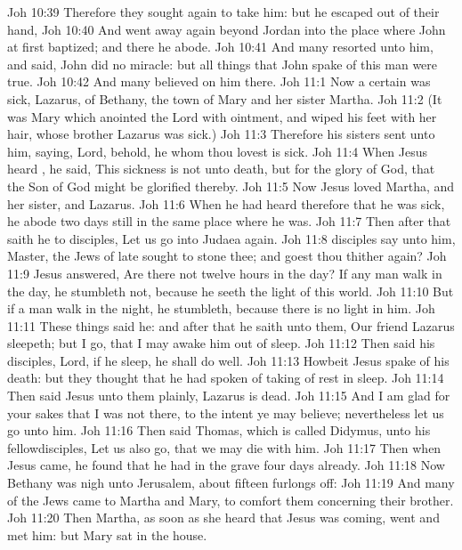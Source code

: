 \vs Joh 10:39 Therefore they sought again to take him: but he escaped out of their hand,
\vs Joh 10:40 And went away again beyond Jordan into the place where John at first baptized; and there he abode.
\vs Joh 10:41 And many resorted unto him, and said, John did no miracle: but all things that John spake of this man were true.
\vs Joh 10:42 And many believed on him there.
\vs Joh 11:1 Now a certain  was sick,  Lazarus, of Bethany, the town of Mary and her sister Martha.
\vs Joh 11:2 (It was  Mary which anointed the Lord with ointment, and wiped his feet with her hair, whose brother Lazarus was sick.)
\vs Joh 11:3 Therefore his sisters sent unto him, saying, Lord, behold, he whom thou lovest is sick.
\vs Joh 11:4 When Jesus heard , he said, This sickness is not unto death, but for the glory of God, that the Son of God might be glorified thereby.
\vs Joh 11:5 Now Jesus loved Martha, and her sister, and Lazarus.
\vs Joh 11:6 When he had heard therefore that he was sick, he abode two days still in the same place where he was.
\vs Joh 11:7 Then after that saith he to  disciples, Let us go into Judaea again.
\vs Joh 11:8  disciples say unto him, Master, the Jews of late sought to stone thee; and goest thou thither again?
\vs Joh 11:9 Jesus answered, Are there not twelve hours in the day? If any man walk in the day, he stumbleth not, because he seeth the light of this world.
\vs Joh 11:10 But if a man walk in the night, he stumbleth, because there is no light in him.
\vs Joh 11:11 These things said he: and after that he saith unto them, Our friend Lazarus sleepeth; but I go, that I may awake him out of sleep.
\vs Joh 11:12 Then said his disciples, Lord, if he sleep, he shall do well.
\vs Joh 11:13 Howbeit Jesus spake of his death: but they thought that he had spoken of taking of rest in sleep.
\vs Joh 11:14 Then said Jesus unto them plainly, Lazarus is dead.
\vs Joh 11:15 And I am glad for your sakes that I was not there, to the intent ye may believe; nevertheless let us go unto him.
\vs Joh 11:16 Then said Thomas, which is called Didymus, unto his fellowdisciples, Let us also go, that we may die with him.
\vs Joh 11:17 Then when Jesus came, he found that he had  in the grave four days already.
\vs Joh 11:18 Now Bethany was nigh unto Jerusalem, about fifteen furlongs off:
\vs Joh 11:19 And many of the Jews came to Martha and Mary, to comfort them concerning their brother.
\vs Joh 11:20 Then Martha, as soon as she heard that Jesus was coming, went and met him: but Mary sat  in the house.
